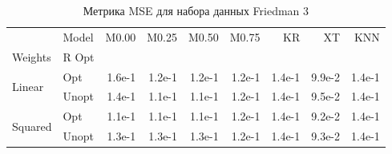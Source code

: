 \begin{table}
\caption{Метрика MSE для набора данных Friedman 3}
\label{tab:MSE_Friedman 3}
\begin{tabular}{llrrrrrrr}
\toprule
 & Model & M0.00 & M0.25 & M0.50 & M0.75 & KR & XT & KNN \\
Weights & R Opt &  &  &  &  &  &  &  \\
\midrule
\multirow[t]{2}{*}{Linear} & Opt & 1.6e-1 & 1.2e-1 & 1.2e-1 & 1.2e-1 & 1.4e-1 & 9.9e-2 & 1.4e-1 \\
 & Unopt & 1.4e-1 & 1.1e-1 & 1.1e-1 & 1.2e-1 & 1.4e-1 & 9.5e-2 & 1.4e-1 \\

\multirow[t]{2}{*}{Squared} & Opt & 1.1e-1 & 1.1e-1 & 1.1e-1 & 1.2e-1 & 1.4e-1 & 9.2e-2 & 1.4e-1 \\
 & Unopt & 1.3e-1 & 1.3e-1 & 1.3e-1 & 1.2e-1 & 1.4e-1 & 9.3e-2 & 1.4e-1 \\

\bottomrule
\end{tabular}
\end{table}
